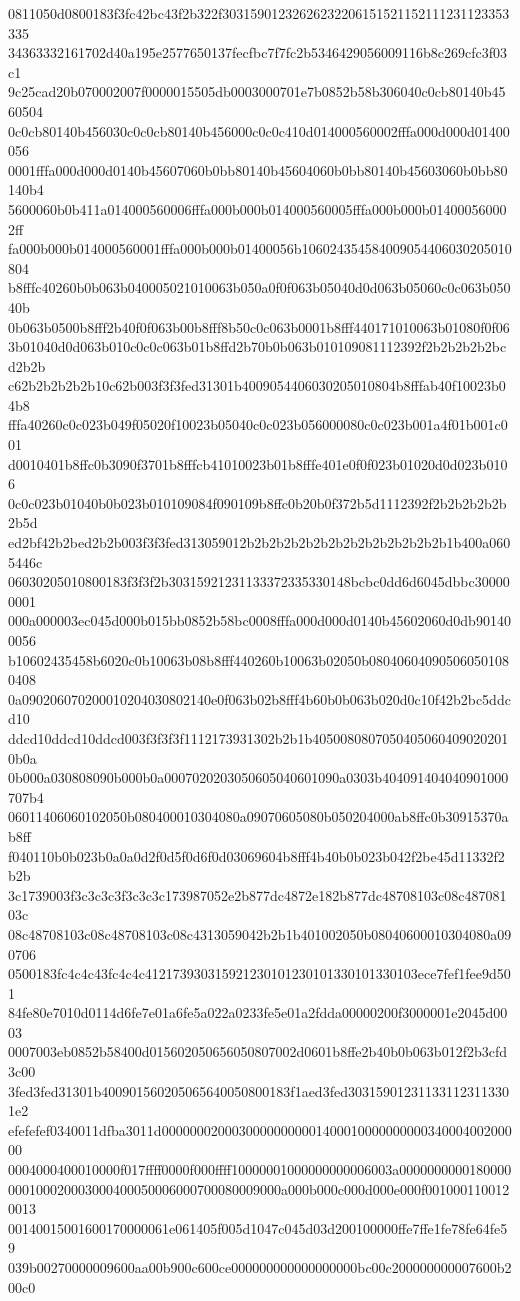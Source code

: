 0811050d0800183f3fc42bc43f2b322f30315901232626232206151521152111231123353335
34363332161702d40a195e2577650137fecfbc7f7fc2b5346429056009116b8c269cfc3f03c1
9c25cad20b070002007f0000015505db0003000701e7b0852b58b306040c0cb80140b4560504
0c0cb80140b456030c0c0cb80140b456000c0c0c410d014000560002fffa000d000d01400056
0001fffa000d000d0140b45607060b0bb80140b45604060b0bb80140b45603060b0bb80140b4
5600060b0b411a014000560006fffa000b000b014000560005fffa000b000b014000560002ff
fa000b000b014000560001fffa000b000b01400056b106024354584009054406030205010804
b8fffc40260b0b063b040005021010063b050a0f0f063b05040d0d063b05060c0c063b05040b
0b063b0500b8fff2b40f0f063b00b8fff8b50c0c063b0001b8fff440171010063b01080f0f06
3b01040d0d063b010c0c0c063b01b8ffd2b70b0b063b010109081112392f2b2b2b2b2bcd2b2b
c62b2b2b2b2b10c62b003f3f3fed31301b4009054406030205010804b8fffab40f10023b04b8
fffa40260c0c023b049f05020f10023b05040c0c023b056000080c0c023b001a4f01b001c001
d0010401b8ffc0b3090f3701b8fffcb41010023b01b8fffe401e0f0f023b01020d0d023b0106
0c0c023b01040b0b023b010109084f090109b8ffc0b20b0f372b5d1112392f2b2b2b2b2b2b5d
ed2bf42b2bed2b2b003f3f3fed313059012b2b2b2b2b2b2b2b2b2b2b2b2b2b1b400a0605446c
06030205010800183f3f3f2b30315921231133372335330148bcbc0dd6d6045dbbc300000001
000a000003ec045d000b015bb0852b58bc0008fffa000d000d0140b45602060d0db901400056
b10602435458b6020c0b10063b08b8fff440260b10063b02050b080406040905060501080408
0a090206070200010204030802140e0f063b02b8fff4b60b0b063b020d0c10f42b2bc5ddcd10
ddcd10ddcd10ddcd003f3f3f3f1112173931302b2b1b40500808070504050604090202010b0a
0b000a030808090b000b0a0007020203050605040601090a0303b404091404040901000707b4
06011406060102050b080400010304080a09070605080b050204000ab8ffc0b30915370ab8ff
f040110b0b023b0a0a0d2f0d5f0d6f0d03069604b8fff4b40b0b023b042f2be45d11332f2b2b
3c1739003f3c3c3c3f3c3c3c173987052e2b877dc4872e182b877dc48708103c08c48708103c
08c48708103c08c48708103c08c4313059042b2b1b401002050b08040600010304080a090706
0500183fc4c4c43fc4c4c412173930315921230101230101330101330103ece7fef1fee9d501
84fe80e7010d0114d6fe7e01a6fe5a022a0233fe5e01a2fdda00000200f3000001e2045d0003
0007003eb0852b58400d015602050656050807002d0601b8ffe2b40b0b063b012f2b3cfd3c00
3fed3fed31301b400901560205065640050800183f1aed3fed303159012311331123113301e2
efefefef0340011dfba3011d0000000200030000000000140001000000000034000400200000
0004000400010000f017ffff0000f000ffff10000001000000000006003a0000000000180000
000100020003000400050006000700080009000a000b000c000d000e000f0010001100120013
00140015001600170000061e061405f005d1047c045d03d200100000ffe7ffe1fe78fe64fe59
039b00270000009600aa00b900c600ce000000000000000000bc00c200000000007600b200c0
